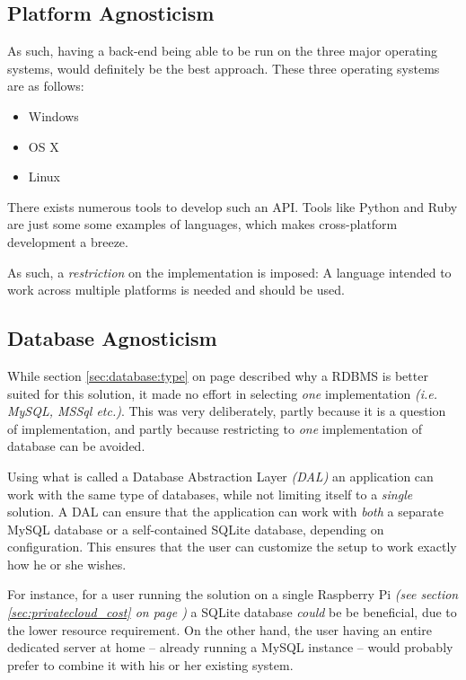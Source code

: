 		\subsection{Platform Agnosticism}
			\label{sec:restrict:platform}
			As such, having a back-end being able to be run on the three major operating systems, would definitely be the best approach. These three operating systems are as follows:
			\begin{itemize}
				\item Windows
				\item OS X
				\item Linux
			\end{itemize}

			There exists numerous tools to develop such an API. Tools like Python and Ruby are just some some examples of languages, which makes cross-platform development a breeze.

			As such, a \emph{restriction} on the implementation is imposed: A language intended to work across multiple platforms is needed and should be used.

		\subsection{Database Agnosticism}
			\label{sec:restrict:database}
			While section \ref{sec:database:type} on page \pageref{sec:database:type} described why a RDBMS is better suited for this solution, it made no effort in selecting \emph{one} implementation \emph{(i.e. MySQL, MSSql etc.)}. This was very deliberately, partly because it is a question of implementation, and partly because restricting to \emph{one} implementation of database can be avoided.

			Using what is called a Database Abstraction Layer \emph{(DAL)} an application can work with the same type of databases, while not limiting itself to a \emph{single} solution. A DAL can ensure that the application can work with \emph{both} a separate MySQL database or a self-contained SQLite database, depending on configuration. This ensures that the user can customize the setup to work exactly how he or she wishes. 

			For instance, for a user running the solution on a single Raspberry Pi \emph{(see section \ref{sec:privatecloud_cost} on page \pageref{sec:privatecloud_cost})} a SQLite database \emph{could} be be beneficial, due to the lower resource requirement. On the other hand, the user having an entire dedicated server at home -- already running a MySQL instance -- would probably prefer to combine it with his or her existing system.

